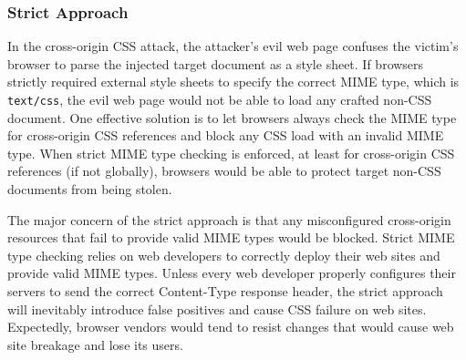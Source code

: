 \documentclass{acm_proc_article-sp}
\begin{document}
\subsubsection{Strict Approach}
In the cross-origin CSS attack, the attacker's evil web page confuses the victim's browser to parse the injected target document as a style sheet. If browsers strictly required external style sheets to specify the correct MIME type, which is \texttt{text/css}, the evil web page would not be able to load any crafted non-CSS document. One effective solution is to let browsers always check the MIME type for cross-origin CSS references and block any CSS load with an invalid MIME type. When strict MIME type checking is enforced, at least for cross-origin CSS references (if not globally), browsers would be able to protect target non-CSS documents from being stolen.

The major concern of the strict approach is that any misconfigured cross-origin resources that fail to provide valid MIME types would be blocked. Strict MIME type checking relies on web developers to correctly deploy their web sites and provide valid MIME types. Unless every web developer properly configures their servers to send the correct Content-Type response header, the strict approach will inevitably introduce false positives and cause CSS failure on web sites. Expectedly, browser vendors would tend to resist changes that would cause web site breakage and lose its users.
\end{document}
